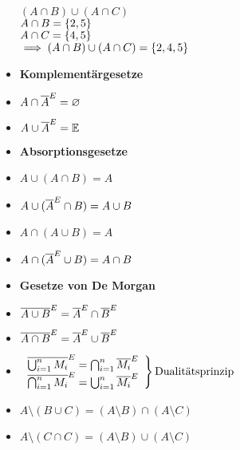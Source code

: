 \begin{itemize}
\begin{minipage}{0.5\columnwidth}
                        ~ \\
                        $(A \cap B) \cup (A \cap C)$ \\
                        $A \cap B = \{ 2, 5 \}$ \\
                        $A \cap C = \{ 4, 5 \}$ \\
                        $\implies (A \cap B) \cup (A \cap C) = \{ 2, 4, 5 \}$
                    \end{minipage}
                \item \textbf{Komplementärgesetze} 
                \item[] $A \cap \overline{A}^E = \varnothing$ 
                \item[] $A \cup \overline{A}^E = \mathbb{E}$ 
                \item \textbf{Absorptionsgesetze}
                \item[] $A \cup (A \cap B) = A $
                \item[] $A \cup (\overline{A}^E \cap B) = A \cup B $
                \item[] $A \cap (A \cup B) = A $
                \item[] $A \cap (\overline{A}^E \cup B) = A \cap B $
                \item \textbf{Gesetze von De Morgan} 
                \item[] $\overline{A \cup B}^E = \overline{A}^E \cap \overline{B}^E$
                \item[] $\overline{A \cap B}^E = \overline{A}^E \cup \overline{B}^E$
                \item[] $ \left.
                    \begin{array}{c}  \komplement{\bigcup_{i=1}^n M_i} = \bigcap_{i=1}^n \komplement{M_i} \\
                                \komplement{\bigcap_{i=1}^n M_i} = \bigcup_{i=1}^n \komplement{M_i} \\
                    \end{array}%
                     \right\} \text{Dualitätsprinzip} $ %
                \item[] $A \setminus (B \cup C) = (A \setminus B) \cap (A \setminus C)$
                \item[] $A \setminus (C \cap C) = (A \setminus B) \cup (A \setminus C)$
                \end{itemize}
